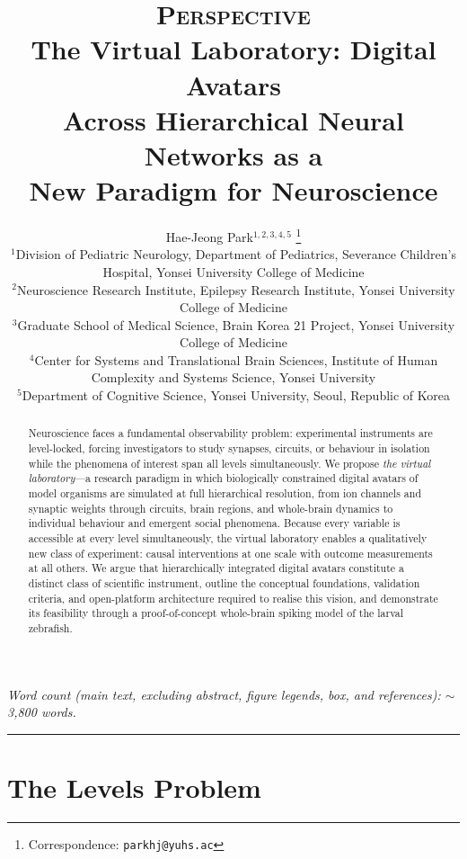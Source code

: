 \documentclass[12pt,a4paper]{article}
\title{%
  \vspace{-1.5cm}
  {\large\textsc{Perspective}}\\[8pt]
  \LARGE\bfseries
  The Virtual Laboratory: Digital Avatars\\
  Across Hierarchical Neural Networks as a\\
  New Paradigm for Neuroscience
}
\author{%
  Hae-Jeong Park$^{1,2,3,4,5}$%
  \thanks{Correspondence: \texttt{parkhj@yuhs.ac}}%
  \\[6pt]
  \small$^{1}$Division of Pediatric Neurology, Department of Pediatrics,
  Severance Children's Hospital, Yonsei University College of Medicine\\
  \small$^{2}$Neuroscience Research Institute, Epilepsy Research Institute,
  Yonsei University College of Medicine\\
  \small$^{3}$Graduate School of Medical Science, Brain Korea 21 Project,
  Yonsei University College of Medicine\\
  \small$^{4}$Center for Systems and Translational Brain Sciences,
  Institute of Human Complexity and Systems Science, Yonsei University\\
  \small$^{5}$Department of Cognitive Science, Yonsei University, Seoul, Republic of Korea%
}
\date{}  %
\begin{document}
\maketitle
\thispagestyle{empty}

{\small\noindent\textit{Word count (main text, excluding abstract,
figure legends, box, and references): $\sim$3{,}800 words.}}
\vspace{6pt}

\begin{abstract}
\noindent
Neuroscience faces a fundamental observability problem: experimental
instruments are level-locked, forcing investigators to study synapses,
circuits, or behaviour in isolation while the phenomena of interest
span all levels simultaneously.
We propose \emph{the virtual laboratory}---a research paradigm in
which biologically constrained digital avatars of model organisms are
simulated at full hierarchical resolution, from ion channels and
synaptic weights through circuits, brain regions, and whole-brain
dynamics to individual behaviour and emergent social phenomena.
Because every variable is accessible at every level simultaneously,
the virtual laboratory enables a qualitatively new class of experiment:
causal interventions at one scale with outcome measurements at all
others.
We argue that hierarchically integrated digital avatars constitute a
distinct class of scientific instrument, outline the conceptual
foundations, validation criteria, and open-platform architecture
required to realise this vision, and demonstrate its feasibility
through a proof-of-concept whole-brain spiking model of the larval
zebrafish.
\end{abstract}

\vspace{4pt}
\noindent\rule{\linewidth}{0.4pt}
\vspace{2pt}


\section*{The Levels Problem}
\end{document}
